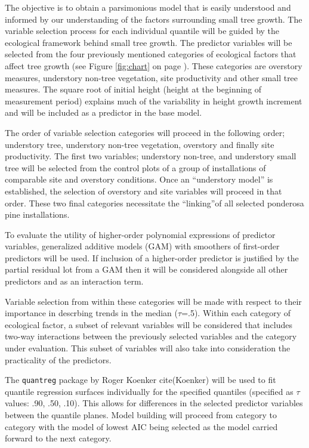 \documentclass[11pt, letterpaper, fleqn]{article}
\begin{document}
The objective is to obtain a parsimonious model that is easily understood and informed by our understanding of the factors surrounding small tree growth. The variable selection process for each individual quantile will be guided by the ecological framework behind small tree growth.  The predictor variables will be selected from the four previously mentioned categories of ecological factors that affect tree growth (see Figure \ref{fig:chart} on page \pageref{fig:chart}). These categories are overstory measures, understory non-tree vegetation, site productivity and other small tree measures.  The square root of initial height (height at the beginning of measurement period) explains much of the variability in height growth increment and will be included as a predictor in the base model.


The order of variable selection categories will proceed in the following order; understory tree, understory non-tree vegetation, overstory and finally site productivity. The first two variables; understory non-tree, and understory small tree will be selected from the control plots of a group of installations of comparable site and overstory conditions. Once an ``understory model'' is established, the selection of overstory and site variables will proceed in that order.  These two final categories necessitate the ``linking''of all selected ponderosa pine installations. 



To evaluate the utility of higher-order polynomial expressions of predictor variables, generalized additive models (GAM) with  smoothers of first-order predictors will be used. If inclusion of a higher-order predictor is justified by the partial residual lot from a GAM then it will be considered alongside all other predictors and as an interaction term.

Variable selection from within these categories will be made with respect to their importance in descrbing trends in the median ($\tau$=.5). Within each category of ecological factor, a subset of relevant variables will be considered that includes two-way interactions between the previously selected variables and the category under evaluation. This subset of variables will also take into consideration the practicality of the predictors.

The \texttt{quantreg} package by Roger Koenker cite(Koenker) will be used to fit quantile regression surfaces individually for the specified quantiles (specified as $\tau$ values: .90, .50, .10).  This allows for differences in the selected predictor variables between the quantile planes.
Model building will proceed from category to category with the model of lowest AIC being selected as the model carried forward to the next category. 
\end{document}
